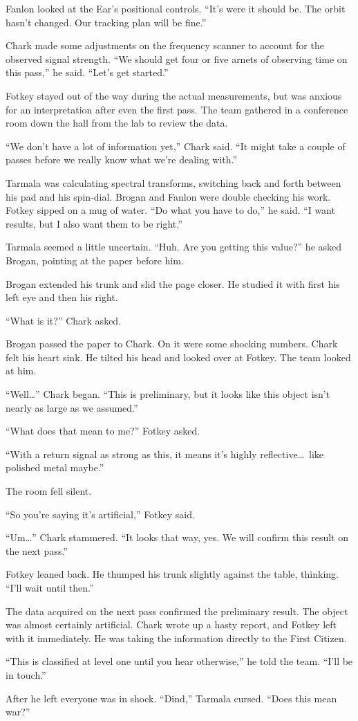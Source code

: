 Fanlon looked at the Ear's positional controls. ``It's were it should be. The orbit hasn't
changed. Our tracking plan will be fine.''

Chark made some adjustments on the frequency scanner to account for the observed signal
strength. ``We should get four or five arnets of observing time on this pass,'' he said. ``Let's
get started.''

Fotkey stayed out of the way during the actual measurements, but was anxious for an
interpretation after even the first pass. The team gathered in a conference room down the hall
from the lab to review the data.


``We don't have a lot of information yet,'' Chark said. ``It might take a couple of passes
before we really know what we're dealing with.''

Tarmala was calculating spectral transforms, switching back and forth between his pad and his
spin-dial. Brogan and Fanlon were double checking his work. Fotkey sipped on a mug of water.
``Do what you have to do,'' he said. ``I want results, but I also want them to be right.''

Tarmala seemed a little uncertain. ``Huh. Are you getting this value?'' he asked Brogan,
pointing at the paper before him.

Brogan extended his trunk and slid the page closer. He studied it with first his left eye and
then his right.

``What is it?'' Chark asked.

Brogan passed the paper to Chark. On it were some shocking numbers. Chark felt his heart sink.
He tilted his head and looked over at Fotkey. The team looked at him.

``Well\ldots'' Chark began. ``This is preliminary, but it looks like this object isn't nearly as
large as we assumed.''

``What does that mean to me?'' Fotkey asked.

``With a return signal as strong as this, it means it's highly reflective\ldots\ like polished
metal maybe.''

The room fell silent.

``So you're saying it's artificial,'' Fotkey said.

``Um\ldots'' Chark stammered. ``It looks that way, yes. We will confirm this result on the next
pass.''

Fotkey leaned back. He thumped his trunk slightly against the table, thinking. ``I'll wait until
then.''

The data acquired on the next pass confirmed the preliminary result. The object was almost
certainly artificial. Chark wrote up a hasty report, and Fotkey left with it immediately. He was
taking the information directly to the First Citizen.

``This is classified at level one until you hear otherwise,'' he told the team. ``I'll be in
touch.''

After he left everyone was in shock. ``Dind,'' Tarmala cursed. ``Does this mean war?''
